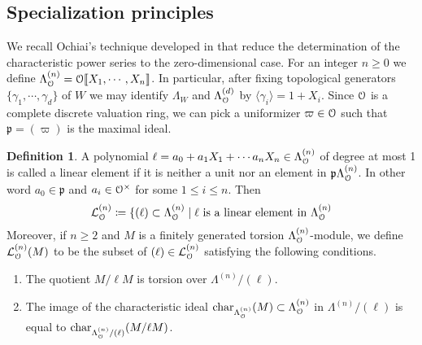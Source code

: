 \documentclass[leqno]{amsart}
\theoremstyle{definition}
\newtheorem{defn}[thm]{Definition}
\theoremstyle{remark}
\newcommand{\eo}{\EuScript{O}}
\newcommand{\fp}{\mathfrak{p}}
\DeclareMathOperator{\car}{char}
\newcommand{\lin}[1]{\mathcal{L}^{(#1)}}
\newcommand{\Lda}[1]{\Lambda^{(#1)}}
\begin{document}
\subsection{Specialization principles}

We recall Ochiai's technique
developed in \cite{Och05}
that reduce the determination of the characteristic power series
to the zero-dimensional case.
For an integer $n\geq 0$ we define
$\Lda{n}_{\eo}=\eo\llbracket X_1,\cdots, X_n\rrbracket$.
In particular, 
after fixing topological generators 
$\{\gamma_1,\cdots,\gamma_d\}$ of $W$
we may identify $\Lambda_W$
and $\Lda{d}_{\eo}$ by $\langle\gamma_i\rangle=1+X_i$.
Since $\eo$ is a complete discrete valuation ring,
we can pick a uniformizer $\varpi\in\eo$ such that $\fp=(\varpi)$
is the maximal ideal.

\begin{defn}\label{def:lin_elt}
A polynomial 
$\ell=a_0+a_1X_1+\cdots a_nX_n\in\Lda{n}_{\eo}$
of degree at most 1
is called a linear element 
if it is neither a unit
nor an element in $\fp\Lda{n}_{\eo}$.
In other word $a_0\in\fp$
and $a_i\in\eo^\times$
for some $1\leq i\leq n$.
Then 
\[
    \lin{n}_{\eo}\coloneqq\{(\ell)\subset \Lda{n}_{\eo}\mid\ell
    \text{ is a linear element in }\Lda{n}_{\eo}
\]
Moreover, if $n\geq 2$
and $M$ is a finitely generated torsion 
$\Lda{n}_{\eo}$-module, we define 
$\lin{n}_{\eo}(M)$ to be the subset of
$(\ell)\in \lin{n}_{\eo}$ satisfying the following conditions.
\begin{enumerate}
    \item The quotient $M/\ell M$ is 
    torsion over $\Lambda^{(n)}/(\ell)$.
    \item The image of the characteristic ideal
    $\car_{\Lda{n}_{\eo}}(M)\subset \Lda{n}_{\eo}$ in $\Lambda^{(n)}/(\ell)$
    is equal to $\car_{\Lda{n}_{\eo}/(\ell)}(M/\ell M)$.
\end{enumerate}
\end{defn}
\end{document}
